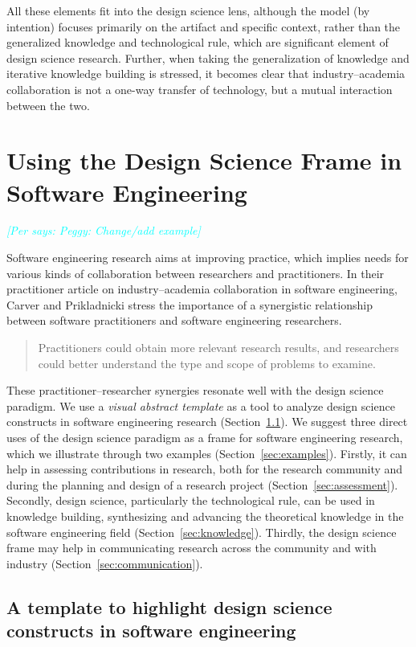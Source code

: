 \documentclass[graybox]{svmult}
\newcommand{\per}[1]{\textcolor{cyan}{{\it [Per says: #1]}}}
\newcommand{\per}[1]{}
\begin{document}
All these elements fit into the design science lens, although the model (by intention) focuses primarily on the artifact and specific context, rather than the generalized knowledge and technological rule, which are significant element of design science research. Further, when taking the generalization of knowledge and iterative knowledge building is stressed, it becomes clear that industry--academia collaboration is not a one-way transfer of technology, but a mutual interaction between the two.


\section{Using the Design Science Frame in Software Engineering}
\label{sec:UsingDSinSE}
\per {Peggy: Change/add example}

Software engineering research aims at improving practice, which implies needs for various kinds of collaboration between researchers and practitioners. In their practitioner article on industry--academia collaboration in software engineering, Carver and Prikladnicki stress the importance of a synergistic relationship between software practitioners and software engineering researchers.
\begin{quote}Practitioners could obtain more relevant research results, and researchers could better understand the type and scope of problems to examine.~\cite{CarverIEEESW2018}
\end{quote} 

These practitioner--researcher synergies resonate well with the design science paradigm.  We use a \emph{visual abstract template} as a tool to analyze design science constructs in software engineering research (Section~\ref{sec:VA_template}). We suggest three direct uses of the design science paradigm as a frame for software engineering research, which we illustrate through two examples (Section~\ref{sec:examples}). Firstly, it can help in assessing contributions in research, both for the research community and during the planning and design of a research project (Section~\ref{sec:assessment}). Secondly, design science, particularly the technological rule, can be used in knowledge building, synthesizing and advancing the theoretical knowledge in the software engineering field (Section~\ref{sec:knowledge}). Thirdly, the design science frame may help in communicating research across the community and with industry (Section~\ref{sec:communication}). 


\subsection{A template to highlight design science constructs in software engineering}
\label{sec:VA_template}
\end{document}
